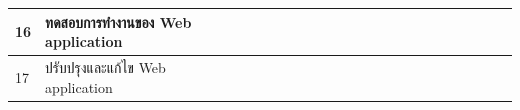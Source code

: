 \documentclass[12pt,oneside,openright,a4paper]{cpe-thai-project}
\begin{document}
\begin{table}[h]
{\begin{tabular}{|llllllllllllllllllllll|}
\multicolumn{1}{|l|}{16}                    & \multicolumn{1}{l|}{ทดสอบการทำงานของ Web application}                                     & \multicolumn{1}{l|}{\cellcolor[HTML]{2D8C9F}} & \multicolumn{1}{l|}{\cellcolor[HTML]{2D8C9F}} & \multicolumn{1}{l|}{\cellcolor[HTML]{2D8C9F}} & \multicolumn{1}{l|}{\cellcolor[HTML]{2D8C9F}} & \multicolumn{1}{l|}{\cellcolor[HTML]{2D8C9F}} & \multicolumn{1}{l|}{\cellcolor[HTML]{2D8C9F}} & \multicolumn{1}{l|}{\cellcolor[HTML]{2D8C9F}} & \multicolumn{1}{l|}{\cellcolor[HTML]{2D8C9F}} & \multicolumn{1}{l|}{\cellcolor[HTML]{2D8C9F}} & \multicolumn{1}{l|}{\cellcolor[HTML]{2D8C9F}} & \multicolumn{1}{l|}{\cellcolor[HTML]{2D8C9F}} & \multicolumn{1}{l|}{\cellcolor[HTML]{2D8C9F}} & \multicolumn{1}{l|}{\cellcolor[HTML]{2D8C9F}} & \multicolumn{1}{l|}{\cellcolor[HTML]{2D8C9F}} & \multicolumn{1}{l|}{\cellcolor[HTML]{2D8C9F}} & \multicolumn{1}{l|}{\cellcolor[HTML]{2D8C9F}} & \multicolumn{1}{l|}{\cellcolor[HTML]{2D8C9F}{\color[HTML]{2D8C9F} }} & \multicolumn{1}{l|}{\cellcolor[HTML]{2D8C9F}{\color[HTML]{2D8C9F} }} & \multicolumn{1}{l|}{\cellcolor[HTML]{2D8C9F}{\color[HTML]{2D8C9F} }} & \cellcolor[HTML]{2D8C9F}{\color[HTML]{2D8C9F} } \\ \hline
\multicolumn{1}{|l|}{17}                    & \multicolumn{1}{l|}{ปรับปรุงและแก้ไข Web application}                                     & \multicolumn{1}{l|}{\cellcolor[HTML]{2D8C9F}} & \multicolumn{1}{l|}{\cellcolor[HTML]{2D8C9F}} & \multicolumn{1}{l|}{\cellcolor[HTML]{2D8C9F}} & \multicolumn{1}{l|}{\cellcolor[HTML]{2D8C9F}} & \multicolumn{1}{l|}{\cellcolor[HTML]{2D8C9F}} & \multicolumn{1}{l|}{\cellcolor[HTML]{2D8C9F}} & \multicolumn{1}{l|}{\cellcolor[HTML]{2D8C9F}} & \multicolumn{1}{l|}{\cellcolor[HTML]{2D8C9F}} & \multicolumn{1}{l|}{\cellcolor[HTML]{2D8C9F}} & \multicolumn{1}{l|}{\cellcolor[HTML]{2D8C9F}} & \multicolumn{1}{l|}{\cellcolor[HTML]{2D8C9F}} & \multicolumn{1}{l|}{\cellcolor[HTML]{2D8C9F}} & \multicolumn{1}{l|}{\cellcolor[HTML]{2D8C9F}} & \multicolumn{1}{l|}{\cellcolor[HTML]{2D8C9F}} & \multicolumn{1}{l|}{\cellcolor[HTML]{2D8C9F}} & \multicolumn{1}{l|}{\cellcolor[HTML]{2D8C9F}} & \multicolumn{1}{l|}{\cellcolor[HTML]{2D8C9F}{\color[HTML]{2D8C9F} }} & \multicolumn{1}{l|}{\cellcolor[HTML]{2D8C9F}{\color[HTML]{2D8C9F} }} & \multicolumn{1}{l|}{\cellcolor[HTML]{2D8C9F}{\color[HTML]{2D8C9F} }} & \cellcolor[HTML]{2D8C9F}{\color[HTML]{2D8C9F} } \\ \hline

\end{tabular}}
\end{table}
\end{document}
